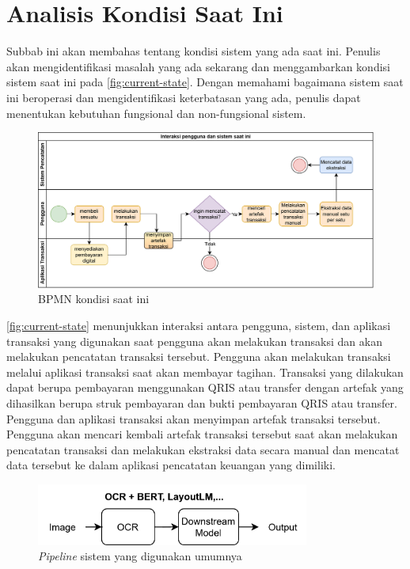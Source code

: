 \section{Analisis Kondisi Saat Ini}
\label{sec:analisis-kondisi-saat-ini}

Subbab ini akan membahas tentang kondisi sistem yang ada saat ini. Penulis akan mengidentifikasi masalah yang ada sekarang dan menggambarkan kondisi sistem saat ini pada \autoref{fig:current-state}. Dengan memahami bagaimana sistem saat ini beroperasi dan mengidentifikasi keterbatasan yang ada, penulis dapat menentukan kebutuhan fungsional dan non-fungsional sistem.

\begin{figure}[htbp]
    \centering
    \includegraphics[width=1\textwidth]{images/current-state.png}
    \caption{BPMN kondisi saat ini}
    \label{fig:current-state}
\end{figure}

\autoref{fig:current-state} menunjukkan interaksi antara pengguna, sistem, dan aplikasi transaksi yang digunakan saat pengguna akan melakukan transaksi dan akan melakukan pencatatan transaksi tersebut. Pengguna akan melakukan transaksi melalui aplikasi transaksi saat akan membayar tagihan. Transaksi yang dilakukan dapat berupa pembayaran menggunakan QRIS atau transfer dengan artefak yang dihasilkan berupa struk pembayaran dan bukti pembayaran QRIS atau transfer. Pengguna dan aplikasi transaksi akan menyimpan artefak transaksi tersebut. Pengguna akan mencari kembali artefak transaksi tersebut saat akan melakukan pencatatan transaksi dan melakukan ekstraksi data secara manual dan mencatat data tersebut ke dalam aplikasi pencatatan keuangan yang dimiliki.

\begin{figure}[htbp]
    \centering
    \includegraphics[width=0.8\textwidth]{images/non-donut-pipeline.png}
    \caption{\emph{Pipeline} sistem yang digunakan umumnya}
    \label{fig:non-donut-pipeline}
\end{figure}

